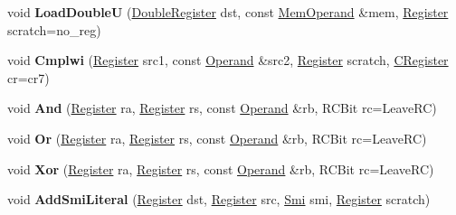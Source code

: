 \begin{DoxyCompactItemize}
void {\bfseries Load\+DoubleU} (\mbox{\hyperlink{classv8_1_1internal_1_1DoubleRegister}{Double\+Register}} dst, const \mbox{\hyperlink{classv8_1_1internal_1_1MemOperand}{Mem\+Operand}} \&mem, \mbox{\hyperlink{classv8_1_1internal_1_1Register}{Register}} scratch=no\+\_\+reg)
\item 
\mbox{\label{classv8_1_1internal_1_1MacroAssembler_a24b945da6a456e807ea9beecdd09f77e}} 
void {\bfseries Cmplwi} (\mbox{\hyperlink{classv8_1_1internal_1_1Register}{Register}} src1, const \mbox{\hyperlink{classv8_1_1internal_1_1Operand}{Operand}} \&src2, \mbox{\hyperlink{classv8_1_1internal_1_1Register}{Register}} scratch, \mbox{\hyperlink{classv8_1_1internal_1_1CRegister}{C\+Register}} cr=cr7)
\item 
\mbox{\label{classv8_1_1internal_1_1MacroAssembler_a0e4a1df61ca5257bade042725487fe35}} 
void {\bfseries And} (\mbox{\hyperlink{classv8_1_1internal_1_1Register}{Register}} ra, \mbox{\hyperlink{classv8_1_1internal_1_1Register}{Register}} rs, const \mbox{\hyperlink{classv8_1_1internal_1_1Operand}{Operand}} \&rb, R\+C\+Bit rc=Leave\+RC)
\item 
\mbox{\label{classv8_1_1internal_1_1MacroAssembler_abbaa8be314f6213d5e188e490bc5a0ac}} 
void {\bfseries Or} (\mbox{\hyperlink{classv8_1_1internal_1_1Register}{Register}} ra, \mbox{\hyperlink{classv8_1_1internal_1_1Register}{Register}} rs, const \mbox{\hyperlink{classv8_1_1internal_1_1Operand}{Operand}} \&rb, R\+C\+Bit rc=Leave\+RC)
\item 
\mbox{\label{classv8_1_1internal_1_1MacroAssembler_a0792faba64d10ffa00d0ba4392fdb865}} 
void {\bfseries Xor} (\mbox{\hyperlink{classv8_1_1internal_1_1Register}{Register}} ra, \mbox{\hyperlink{classv8_1_1internal_1_1Register}{Register}} rs, const \mbox{\hyperlink{classv8_1_1internal_1_1Operand}{Operand}} \&rb, R\+C\+Bit rc=Leave\+RC)
\item 
\mbox{\label{classv8_1_1internal_1_1MacroAssembler_afa4609f80fa797018b05d9741da455ee}} 
void {\bfseries Add\+Smi\+Literal} (\mbox{\hyperlink{classv8_1_1internal_1_1Register}{Register}} dst, \mbox{\hyperlink{classv8_1_1internal_1_1Register}{Register}} src, \mbox{\hyperlink{classv8_1_1internal_1_1Smi}{Smi}} smi, \mbox{\hyperlink{classv8_1_1internal_1_1Register}{Register}} scratch)

\end{DoxyCompactItemize}
